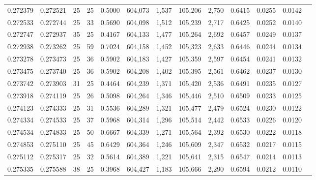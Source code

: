 \begin{tabular}{rrrrrrrrrrrrr}
0.272379 & 0.272521 &    25 &  25 &                                     0.5000 & 604,073 &   1,537 & 105,206 &   2,750 & 0.6415 & 0.0255 & 0.0142 \\
0.272533 & 0.272744 &    25 &  33 &                                     0.5690 & 604,098 &   1,512 & 105,239 &   2,717 & 0.6425 & 0.0252 & 0.0140 \\
0.272747 & 0.272937 &    35 &  25 &                                     0.4167 & 604,133 &   1,477 & 105,264 &   2,692 & 0.6457 & 0.0249 & 0.0137 \\
0.272938 & 0.273262 &    25 &  59 &                                     0.7024 & 604,158 &   1,452 & 105,323 &   2,633 & 0.6446 & 0.0244 & 0.0134 \\
0.273278 & 0.273473 &    25 &  36 &                                     0.5902 & 604,183 &   1,427 & 105,359 &   2,597 & 0.6454 & 0.0241 & 0.0132 \\
0.273475 & 0.273740 &    25 &  36 &                                     0.5902 & 604,208 &   1,402 & 105,395 &   2,561 & 0.6462 & 0.0237 & 0.0130 \\
0.273742 & 0.273903 &    31 &  25 &                                     0.4464 & 604,239 &   1,371 & 105,420 &   2,536 & 0.6491 & 0.0235 & 0.0127 \\
0.273918 & 0.274119 &    25 &  26 &                                     0.5098 & 604,264 &   1,346 & 105,446 &   2,510 & 0.6509 & 0.0233 & 0.0125 \\
0.274123 & 0.274333 &    25 &  31 &                                     0.5536 & 604,289 &   1,321 & 105,477 &   2,479 & 0.6524 & 0.0230 & 0.0122 \\
0.274334 & 0.274533 &    25 &  37 &                                     0.5968 & 604,314 &   1,296 & 105,514 &   2,442 & 0.6533 & 0.0226 & 0.0120 \\
0.274534 & 0.274833 &    25 &  50 &                                     0.6667 & 604,339 &   1,271 & 105,564 &   2,392 & 0.6530 & 0.0222 & 0.0118 \\
0.274853 & 0.275110 &    25 &  45 &                                     0.6429 & 604,364 &   1,246 & 105,609 &   2,347 & 0.6532 & 0.0217 & 0.0115 \\
0.275112 & 0.275317 &    25 &  32 &                                     0.5614 & 604,389 &   1,221 & 105,641 &   2,315 & 0.6547 & 0.0214 & 0.0113 \\
0.275335 & 0.275588 &    38 &  25 &                                     0.3968 & 604,427 &   1,183 & 105,666 &   2,290 & 0.6594 & 0.0212 & 0.0110 \\

\end{tabular}
